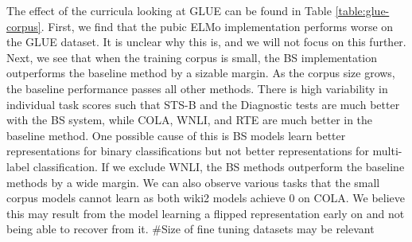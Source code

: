 \begin{table}[]
\caption{GLUE results for CRS vs. baseline.}
\label{table:glue-corpus}
\end{table}
The effect of the curricula looking at GLUE can be found in Table \ref{table:glue-corpus}. First, we find that the pubic ELMo implementation performs worse on the GLUE dataset. It is unclear why this is, and we will not focus on this further. Next, we see that when the training corpus is small, the BS implementation outperforms the baseline method by a sizable margin. As the corpus size grows, the baseline performance passes all other methods. There is high variability in individual task scores such that STS-B and the Diagnostic tests are much better with the BS system, while COLA, WNLI, and RTE are much better in the baseline method. One possible cause of this is BS models learn better representations for binary classifications but not better representations for multi-label classification. If we exclude WNLI, the BS methods outperform the baseline methods by a wide margin. We can also observe various tasks that the small corpus models cannot learn as both wiki2 models achieve 0 on COLA. We believe this may result from the model learning a flipped representation early on and not being able to recover from it. #Size of fine tuning datasets may be relevant
